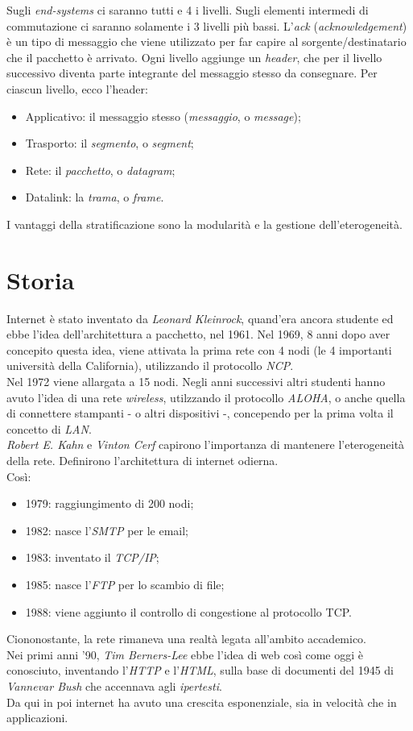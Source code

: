 Sugli \textit{end-systems} ci saranno tutti e 4 i livelli.
Sugli elementi intermedi di commutazione ci saranno solamente i 3 livelli più bassi.
L'\textit{ack} (\textit{acknowledgement}) è un tipo di messaggio che viene utilizzato per far capire al sorgente/destinatario che il pacchetto è arrivato.
Ogni livello aggiunge un \textit{header}, che per il livello successivo diventa parte integrante del messaggio stesso da consegnare. Per ciascun livello, ecco l'header:
\begin{itemize}
    \item Applicativo: il messaggio stesso (\textit{messaggio}, o \textit{message});
    \item Trasporto: il \textit{segmento}, o \textit{segment};
    \item Rete: il \textit{pacchetto}, o \textit{datagram};
    \item Datalink: la \textit{trama}, o \textit{frame}.
\end{itemize}
I vantaggi della stratificazione sono la modularità e la gestione dell'eterogeneità.

\section{Storia}
Internet è stato inventato da \textit{Leonard Kleinrock}, quand'era ancora studente ed ebbe l'idea dell'architettura a pacchetto, nel 1961.
Nel 1969, 8 anni dopo aver concepito questa idea, viene attivata la prima rete con 4 nodi (le 4 importanti università della California), utilizzando il protocollo \textit{NCP}.
\\
Nel 1972 viene allargata a 15 nodi.
Negli anni successivi altri studenti hanno avuto l'idea di una rete \textit{wireless}, utilzzando il protocollo \textit{ALOHA}, o anche quella di connettere stampanti - o altri dispositivi -, concependo per la prima volta il concetto di \textit{LAN}.
\\
\textit{Robert E. Kahn} e \textit{Vinton Cerf} capirono l'importanza di mantenere l'eterogeneità della rete. Definirono l'architettura di internet odierna.
\\
Così:
\begin{itemize}
    \item 1979: raggiungimento di 200 nodi;
    \item 1982: nasce l'\textit{SMTP} per le email;
    \item 1983: inventato il \textit{TCP/IP};
    \item 1985: nasce l'\textit{FTP} per lo scambio di file;
    \item 1988: viene aggiunto il controllo di congestione al protocollo TCP.
\end{itemize}
Ciononostante, la rete rimaneva una realtà legata all'ambito accademico.
\\
Nei primi anni '90, \textit{Tim Berners-Lee} ebbe l'idea di web così come oggi è conosciuto, inventando l'\textit{HTTP} e l'\textit{HTML}, sulla base di documenti del 1945 di \textit{Vannevar Bush} che accennava agli \textit{ipertesti}.
\\
Da qui in poi internet ha avuto una crescita esponenziale, sia in velocità che in applicazioni.